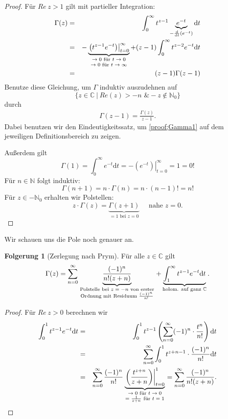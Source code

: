 \documentclass[11pt,titlepage]{article}
\theoremstyle{definition}
\newtheorem{corollary}[theorem]{Folgerung}
\theoremstyle{remark}
\begin{document}
	\begin{proof}
		Für $Re\ z>1$ gilt mit partieller Integration:
		\begin{eqnarray*}
			\Gamma(z)&=&\int_0^{\infty} t^{z-1}\underbrace{e^{-t}}_
			{-\frac{\mathrm{d}}{\mathrm{d}t}(e^{-t})}\mathrm{d}t \\
			&=& -\underbrace{\left.\left( t^{z-1}e^{-t}\right)\right\vert_{t=0}^{\infty}}_{\genfrac{}{}{0pt}{1}{\text{$\to0$ für 
			$t\to0$}}{\text{$\to0$ für 
			$t\to\infty$}}}
			+(z-1)\int_0^{\infty} t^{z-2}e^{-t}\mathrm{d}t \\
			&=&(z-1)\Gamma(z-1)
		\end{eqnarray*}
		Benutze diese Gleichung, um $\Gamma$ induktiv auszudehnen auf 
		\[ \{ z\in\mathbb{C} \ \vert\ Re(z)>-n\text{ \& }-z\notin\mathbb{N}_0 \} \]
		durch 
		\begin{eqnarray}
			\Gamma(z-1)=\frac{\Gamma(z)}{z-1}. \label{proof;Gamma1}
		\end{eqnarray}
		Dabei benutzen wir den Eindeutigkeitssatz, um \ref{proof;Gamma1} auf dem jeweiligen Definitionsbereich 
		zu zeigen.
		
		
		
		
		Außerdem gilt
		\[ \Gamma(1)=\int_0^{\infty}e^{-t}\mathrm{d}t=-\left.(e^{-t})\right\vert_{t=0}^{\infty} =1 =0! \]
		Für $n\in\mathbb{N}$ folgt induktiv:
		\[ \Gamma(n+1)=n\cdot \Gamma(n)= n\cdot (n-1)! = n! \]
		Für $z\in -\mathbb{N}_0$ erhalten wir Polstellen:
		\[ z\cdot \Gamma(z) = \underbrace{\Gamma(z+1)}_{=1 \text{ bei }z=0} \quad \text{ nahe }z=0.\]
	\end{proof}
	
	Wir schauen uns die Pole noch genauer an.
	
	\begin{corollary}[Zerlegung nach Prym] \label{coroll:Prym}
		Für alle $z\in\mathbb{C}$ gilt
		\[ \Gamma(z) =\sum_{n=0}^{\infty} \underbrace{\frac{(-1)^n}{n!(z+n)}}_
		{\genfrac{}{}{0pt}{1}{\text{Polstelle bei $z=-n$ von erster}}
		{\text{Ordnung mit Residuum $\frac{(-1)^n}{n!}$}}} +\underbrace{\int_1^{\infty} t^{z-1}e^{-t}\mathrm{d}t}
		_{\text{holom. auf ganz $\mathbb{C}$}}. \]
	\end{corollary}
	
	\begin{proof}
		Für $Re\ z>0$ berechnen wir
		\begin{eqnarray*}
			\int_0^1 t^{z-1}e^{-t}\mathrm{d}t &=& \int_0^1 t^{z-1} \left( \sum_{n=0}^{\infty} (-1)^n \cdot 
			\frac{ t^n}{n!}\right)\mathrm{d}t \\
			&=& \sum_{n=0}^{\infty} \int_0^1 t^{z+n-1} \cdot \frac{(-1)^n}{n!}\mathrm{d}t \\
			&=& \sum_{n=0}^{\infty} \frac{(-1)^n}{n!} \underbrace{\left.\left(\frac{t^{z+n}}{z+n}\right)\right\vert_{t=0}^1}_
			{\genfrac{}{}{0pt}{1}{\text{$\to 0$ für $t\to 0$}}{\text{$=\frac{1}{z+n}$ für $ t=1$}}} 
			= \sum_{n=0}^{\infty} \frac{(-1)^n}{n!(z+n)}.
		\end{eqnarray*}
	\end{proof}
	
\end{document}
